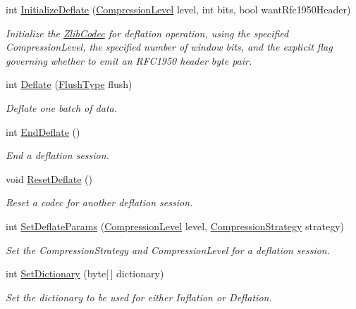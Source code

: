 \begin{DoxyCompactItemize}
int \mbox{\hyperlink{class_super_tiled2_unity_1_1_ionic_1_1_zlib_1_1_zlib_codec_acb745f70067c5b131d3306ae84f17c5f}{Initialize\+Deflate}} (\mbox{\hyperlink{namespace_super_tiled2_unity_1_1_ionic_1_1_zlib_a20f6771804996c363f454ad9765cd7db}{Compression\+Level}} level, int bits, bool want\+Rfc1950\+Header)
\begin{DoxyCompactList}\small\item\em Initialize the \mbox{\hyperlink{class_super_tiled2_unity_1_1_ionic_1_1_zlib_1_1_zlib_codec}{Zlib\+Codec}} for deflation operation, using the specified Compression\+Level, the specified number of window bits, and the explicit flag governing whether to emit an R\+F\+C1950 header byte pair. \end{DoxyCompactList}\item 
int \mbox{\hyperlink{class_super_tiled2_unity_1_1_ionic_1_1_zlib_1_1_zlib_codec_afeb80a3bb4f9bfdbe76e7364d617808c}{Deflate}} (\mbox{\hyperlink{namespace_super_tiled2_unity_1_1_ionic_1_1_zlib_a2c5853fd63f03c83ac2458da1f4ff3bc}{Flush\+Type}} flush)
\begin{DoxyCompactList}\small\item\em Deflate one batch of data. \end{DoxyCompactList}\item 
int \mbox{\hyperlink{class_super_tiled2_unity_1_1_ionic_1_1_zlib_1_1_zlib_codec_af27aed7df6b5594215c311219d56ee35}{End\+Deflate}} ()
\begin{DoxyCompactList}\small\item\em End a deflation session. \end{DoxyCompactList}\item 
void \mbox{\hyperlink{class_super_tiled2_unity_1_1_ionic_1_1_zlib_1_1_zlib_codec_a75cf8e1228a42f1646f4697059e24d8a}{Reset\+Deflate}} ()
\begin{DoxyCompactList}\small\item\em Reset a codec for another deflation session. \end{DoxyCompactList}\item 
int \mbox{\hyperlink{class_super_tiled2_unity_1_1_ionic_1_1_zlib_1_1_zlib_codec_afa2870874eea3783d45f87599760dffa}{Set\+Deflate\+Params}} (\mbox{\hyperlink{namespace_super_tiled2_unity_1_1_ionic_1_1_zlib_a20f6771804996c363f454ad9765cd7db}{Compression\+Level}} level, \mbox{\hyperlink{namespace_super_tiled2_unity_1_1_ionic_1_1_zlib_abde5c10a1e2ee453e1e8e22e79a39a3b}{Compression\+Strategy}} strategy)
\begin{DoxyCompactList}\small\item\em Set the Compression\+Strategy and Compression\+Level for a deflation session. \end{DoxyCompactList}\item 
int \mbox{\hyperlink{class_super_tiled2_unity_1_1_ionic_1_1_zlib_1_1_zlib_codec_a0d2bbfa7f01f3ddaa8637ab022aa61af}{Set\+Dictionary}} (byte\mbox{[}$\,$\mbox{]} dictionary)
\begin{DoxyCompactList}\small\item\em Set the dictionary to be used for either Inflation or Deflation. \end{DoxyCompactList}\end{DoxyCompactItemize}
